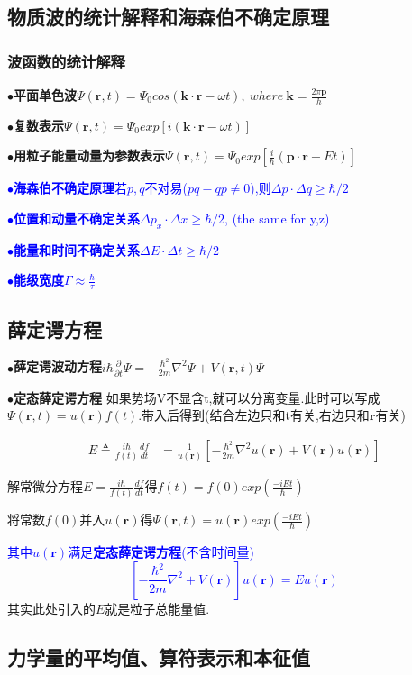 \documentclass[UTF8]{article}
\newcommand{\keypoint}[2]{$\bullet$\textbf{#1}\quad#2\par}
\begin{document}
\subsection{物质波的统计解释和海森伯不确定原理}
\subsubsection{波函数的统计解释}
\keypoint{平面单色波}{$\Psi(\bm{r},t)=\Psi_{0}cos(\bm{k\cdot r}-\omega t),\ where\  \bm{k}=\frac{2\pi\bm{p}}{h}$}
\keypoint{复数表示}{$\Psi(\bm{r},t)=\Psi_{0}exp[i(\bm{k\cdot r}-\omega t)]$}
\keypoint{用粒子能量动量为参数表示}{$\Psi(\bm{r},t)=\Psi_{0}exp[\frac{i}{\hbar}(\bm{p\cdot r}-Et)]$}
\textcolor{blue}{\keypoint{海森伯不确定原理}{若$p,q$不对易($pq-qp\neq 0$),则$\Delta p\cdot\Delta q\ge \hbar/2$}
\keypoint{位置和动量不确定关系}{$\Delta p_{x}\cdot\Delta x\ge \hbar/2$, (the same for y,z)}
\keypoint{能量和时间不确定关系}{$\Delta E\cdot\Delta t\ge \hbar/2$}}
\textcolor{blue}{\keypoint{能级宽度}{$\Gamma\approx\frac{\hbar}{\tau}$}}
\subsection{薛定谔方程}
\keypoint{薛定谔波动方程}{$i\hbar\frac{\partial}{\partial t}\Psi=-\frac{\hbar^{2}}{2m}\nabla^{2}\Psi+V(\bm{r},t)\Psi$}
\keypoint{定态薛定谔方程}{
	如果势场V不显含t,就可以分离变量.此时可以写成$\Psi(\bm{r},t)=u(\bm{r})f(t)$.带入后得到(结合左边只和t有关,右边只和$\bm{r}$有关)\par
	\begin{align*}
	E\triangleq \frac{i\hbar}{f(t)}\frac{df}{dt}&=\frac{1}{u(\bm{r})}[-\frac{\hbar^{2}}{2m}\nabla^{2}u(\bm{r})+V(\bm{r})u(\bm{r})]
	\end{align*}\par
	解常微分方程$E=\frac{i\hbar}{f(t)}\frac{df}{dt}$得$f(t)=f(0)exp(\frac{-iEt}{\hbar})$\par
	将常数$f(0)$并入$u(\bm{r})$得$\Psi(\bm{r},t)=u(\bm{r})exp(\frac{-iEt}{\hbar})$\par
	\textcolor{blue}{其中$u(\bm{r})$满足\textbf{定态薛定谔方程}(不含时间量)
	$$[-\frac{\hbar^{2}}{2m}\nabla^{2}+V(\bm{r})]u(\bm{r})=Eu(\bm{r})$$}
	其实此处引入的$E$就是粒子总能量值.\par
}
\subsection{力学量的平均值、算符表示和本征值}
\end{document}
